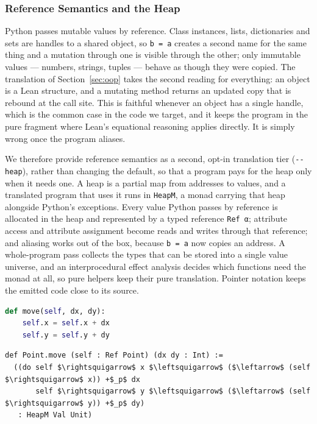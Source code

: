 \documentclass{article}
\newcommand{\code}{\lstinline}
\newcommand{\leftsquigarrow}{\reflectbox{$\rightsquigarrow$}}
\begin{document}
{\subsubsection{Reference Semantics and the Heap}\label{sec:heap}
Python passes mutable values by reference. Class instances, lists, dictionaries and sets are handles to
a shared object, so \code{b = a} creates a second name for the same thing and a mutation through one is
visible through the other; only immutable values --- numbers, strings, tuples --- behave as though they
were copied. The translation of Section~\ref{sec:oop} takes the second reading for everything: an
object is a Lean structure, and a mutating method returns an updated copy that is rebound at the call
site. This is faithful whenever an object has a single handle, which is the common case in the code we
target, and it keeps the program in the pure fragment where Lean's equational reasoning applies
directly. It is simply wrong once the program aliases.

We therefore provide reference semantics as a second, opt-in translation tier (\code{--heap}), rather
than changing the default, so that a program pays for the heap only when it needs one. A heap is a
partial map from addresses to values, and a translated program that uses it runs in \code{HeapM}, a
monad carrying that heap alongside Python's exceptions. Every value Python passes by reference is
allocated in the heap and represented by a typed reference \code{Ref α}; attribute access and attribute
assignment become reads and writes through that reference; and aliasing works out of the box, because
\code{b = a} now copies an address. A whole-program pass collects the types that can be stored into a
single value universe, and an interprocedural effect analysis decides which functions need the monad
at all, so pure helpers keep their pure translation. Pointer notation keeps the emitted code close to
its source.

\noindent
\begin{minipage}[t]{0.42\textwidth}
\begin{lstlisting}[language=python,caption={Python source.},label={lst:heap-py},breaklines=true]
def move(self, dx, dy):
    self.x = self.x + dx
    self.y = self.y + dy
\end{lstlisting}
\end{minipage}%
\hfill
\begin{minipage}[t]{0.54\textwidth}
\begin{lstlisting}[language=lean,caption={Generated \code{--heap} translation.},label={lst:heap-lean},breaklines=true,mathescape=true]
def Point.move (self : Ref Point) (dx dy : Int) :=
  ((do self $\rightsquigarrow$ x $\leftsquigarrow$ ($\leftarrow$ (self $\rightsquigarrow$ x)) +$_p$ dx
       self $\rightsquigarrow$ y $\leftsquigarrow$ ($\leftarrow$ (self $\rightsquigarrow$ y)) +$_p$ dy)
   : HeapM Val Unit)
\end{lstlisting}
\end{minipage}

}
\end{document}
